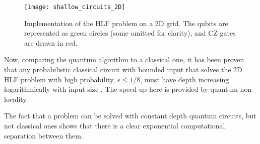 \begin{figure}[!htbp]
\texttt{[image: shallow\_circuits\_2D]}
\caption{\label{fig:2DHLFgrid} Implementation of the HLF problem on a 2D grid. The qubits are represented as green circles (some omitted for clarity), and CZ gates are drawn in red.}
\end{figure}

Now, comparing the quantum algorithm to a classical one, it has been proven that any probabilistic classical circuit with bounded input that solves the 2D HLF problem with high probability, $\epsilon \leq 1/8$, must have depth increasing logarithmically with input size \cite{bib:bravyi2018quantum}. The speed-up here is provided by quantum non-locality. 

The fact that a problem can be solved with constant depth quantum circuits, but not classical ones shows that there is a clear exponential computational separation between them. 
